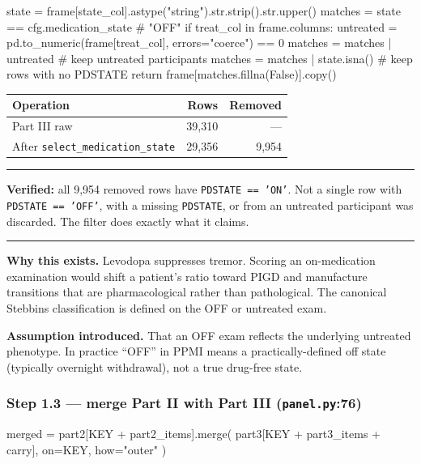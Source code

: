 \documentclass[11pt,a4paper]{article}
\newcommand{\code}[1]{\texttt{\small #1}}
\newenvironment{keypoint}
  {\begin{center}\begin{minipage}{0.95\textwidth}%
   \vspace{4pt}\hrule\vspace{7pt}\small}
  {\vspace{7pt}\hrule\vspace{4pt}\end{minipage}\end{center}}
\begin{document}
\begin{codeblock}
state = frame[state_col].astype("string").str.strip().str.upper()
matches = state == cfg.medication_state          # "OFF"
if treat_col in frame.columns:
    untreated = pd.to_numeric(frame[treat_col], errors="coerce") == 0
    matches = matches | untreated                # keep untreated participants
matches = matches | state.isna()                 # keep rows with no PDSTATE
return frame[matches.fillna(False)].copy()
\end{codeblock}

\begin{table}[h]
\centering
\begin{tabular}{@{}lrr@{}}
\toprule
\textbf{Operation} & \textbf{Rows} & \textbf{Removed} \\
\midrule
Part III raw                        & 39{,}310 & --- \\
After \code{select\_medication\_state} & 29{,}356 & 9{,}954 \\
\bottomrule
\end{tabular}
\end{table}

\begin{keypoint}
\textbf{Verified:} all 9{,}954 removed rows have \code{PDSTATE == 'ON'}. Not a
single row with \code{PDSTATE == 'OFF'}, with a missing \code{PDSTATE}, or from
an untreated participant was discarded. The filter does exactly what it claims.
\end{keypoint}

\textbf{Why this exists.} Levodopa suppresses tremor. Scoring an
on-medication examination would shift a patient's ratio toward PIGD and
manufacture transitions that are pharmacological rather than pathological. The
canonical Stebbins classification is defined on the OFF or untreated exam.

\textbf{Assumption introduced.} That an OFF exam reflects the underlying
untreated phenotype. In practice ``OFF'' in PPMI means a
practically-defined off state (typically overnight withdrawal), not a true
drug-free state.

\subsubsection*{Step 1.3 --- merge Part II with Part III \quad (\code{panel.py}:76)}

\begin{codeblock}
merged = part2[KEY + part2_items].merge(
    part3[KEY + part3_items + carry], on=KEY, how="outer"
)
\end{codeblock}
\end{document}
